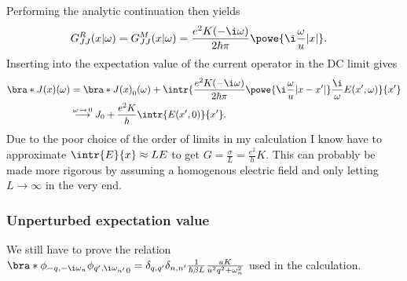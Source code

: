 \documentclass[english, parskip=full]{scrartcl}
\begin{document}
Performing the analytic continuation then yields
\begin{align}
G_{JJ}^R(x|\omega) &= G_{JJ}^M(x|\omega) = \frac{e^2K (-\i\omega)}{2\hbar\pi} \powe{\i\frac{\omega}{u}|x|}.
\end{align}
Inserting into the expectation value of the current operator in the DC limit gives
\begin{align}
\bra*{J(x)}(\omega) &= \bra*{J(x)}_0(\omega) + \intr{\frac{e^2K (-\i\omega)}{2\hbar \pi} \powe{\i \frac{\omega}{u} |x-x'|} \frac{\i}{\omega} E(x',\omega)}{x'}  \\
& \overset{\omega\,\rightarrow\, 0}{\longrightarrow}  J_0 + \frac{e^2K}{h} \intr{E(x',0)}{x'}.
\end{align}
Due to the poor choice of the order of limits in my calculation I know have to approximate $\intr{E}{x} \approx L E$ to get $G= \frac{\sigma}{L} = \frac{e^2}{h}K$.
This can probably be made more rigorous by assuming a homogenous electric field and only letting $L\rightarrow\infty$ in the very end.

\subsubsection*{Unperturbed expectation value}
We still have to prove the relation $\bra*{\phi_{-q,-\i\omega_n} \phi_{q',\i\omega_{n'}}}_0 = \delta_{q,q'} \delta_{n,n'} \frac{1}{\hbar\beta L} \frac{uK}{u^2q^2 + \omega_n^2}$ used in the calculation.

\end{document}
